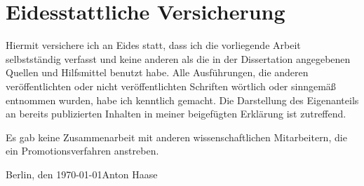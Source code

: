 
\section*{Eidesstattliche Versicherung}
\vspace{3ex}

Hiermit versichere ich an Eides statt, dass ich die vorliegende Arbeit selbstständig verfasst und keine anderen als die in der Dissertation angegebenen Quellen und Hilfsmittel benutzt habe.
Alle Ausführungen, die anderen veröffentlichten oder nicht veröffentlichten Schriften wörtlich oder sinngemäß entnommen wurden, habe ich kenntlich gemacht.
Die Darstellung des Eigenanteils an bereits publizierten Inhalten in meiner beigefügten Erklärung ist zutreffend.

Es gab keine Zusammenarbeit mit anderen wissenschaftlichen Mitarbeitern, die ein Promotionsverfahren anstreben.

\vspace{3cm}

\noindent Berlin, den \today \hfill Anton Haase

\cleardoublepage
